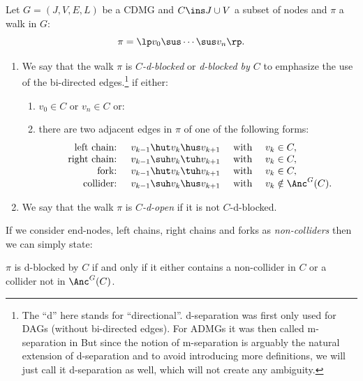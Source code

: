\begin{Def}\label{def:d-blocking}
      Let $G=(J,V,E,L)$ be a CDMG and $C \ins J \cup V$ a subset of nodes and $\pi$ a walk in $G$:
      \[ \pi =\lp  v_0 \sus \cdots \sus v_n \rp.  \]
      \begin{enumerate}
          \item
              We say that the walk $\pi$ is \emph{$C$-d-blocked} or \emph{d-blocked by $C$} to emphasize the use of the bi-directed edges.\footnote{The ``d'' here stands for ``directional''. d-separation was first only used for DAGs (without bi-directed edges).  For ADMGs it was then called m-separation in \cite{Ric03} But since the notion of m-separation is arguably the natural extension of d-separation and to avoid introducing more definitions, we will just call it d-separation as well, which will not create any ambiguity.} 
              if either:
      \begin{enumerate}[label=\roman*.)]
          \item $v_0 \in C$ or $v_n \in C$ or:
          \item there are two adjacent edges in $\pi$ of one of the following forms:
              \[\begin{array}{rccl}
           \text{ left chain: } & v_{k-1} \hut v_k \hus v_{k+1} & \text{ with } & v_k \in C,\\
           \text{ right chain: } & v_{k-1} \suh v_k \tuh v_{k+1} & \text{ with } & v_k \in C,\\
           \text{ fork: } & v_{k-1} \hut v_k \tuh v_{k+1} & \text{ with } & v_k \in C,\\
           \text{ collider: } & v_{k-1} \suh v_k \hus v_{k+1} & \text{ with } & v_k \notin \Anc^G(C).
              \end{array}\]
      \end{enumerate}
          \item We say that the walk $\pi$ is \emph{$C$-d-open} if it is not $C$-d-blocked.
      \end{enumerate}
\end{Def}

\begin{Rem}
          If we consider end-nodes, left chains, right chains and forks as \emph{non-colliders} then we can simply state:

      $\pi$ is d-blocked by $C$ if and only if it either contains a non-collider in $C$ or a collider not in $\Anc^G(C)$.
\end{Rem}

